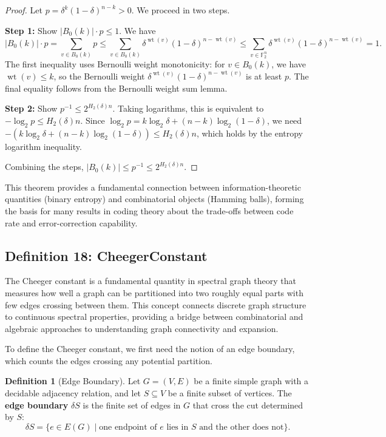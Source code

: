\documentclass[11pt]{article}
\theoremstyle{plain}
\theoremstyle{definition}
\newtheorem*{definition}{Definition}
\theoremstyle{remark}
\begin{document}
\begin{proof}
Let $p = \delta^k(1-\delta)^{n-k} > 0$. We proceed in two steps.

\textbf{Step 1:} Show $|B_0(k)| \cdot p \leq 1$. We have
\[
|B_0(k)| \cdot p = \sum_{v \in B_0(k)} p \leq \sum_{v \in B_0(k)} \delta^{\operatorname{wt}(v)}(1-\delta)^{n-\operatorname{wt}(v)} \leq \sum_{v \in \mathbb{F}_2^n} \delta^{\operatorname{wt}(v)}(1-\delta)^{n-\operatorname{wt}(v)} = 1.
\]
The first inequality uses Bernoulli weight monotonicity: for $v \in B_0(k)$, we have $\operatorname{wt}(v) \leq k$, so the Bernoulli weight $\delta^{\operatorname{wt}(v)}(1-\delta)^{n-\operatorname{wt}(v)}$ is at least $p$. The final equality follows from the Bernoulli weight sum lemma.

\textbf{Step 2:} Show $p^{-1} \leq 2^{H_2(\delta) n}$. Taking logarithms, this is equivalent to $-\log_2 p \leq H_2(\delta) n$. Since $\log_2 p = k\log_2\delta + (n-k)\log_2(1-\delta)$, we need $-(k\log_2\delta + (n-k)\log_2(1-\delta)) \leq H_2(\delta) n$, which holds by the entropy logarithm inequality.

Combining the steps, $|B_0(k)| \leq p^{-1} \leq 2^{H_2(\delta) n}$.
\end{proof}

This theorem provides a fundamental connection between information-theoretic quantities (binary entropy) and combinatorial objects (Hamming balls), forming the basis for many results in coding theory about the trade-offs between code rate and error-correction capability.

\vspace{1em}

\subsection{Definition 18: CheegerConstant}

The Cheeger constant is a fundamental quantity in spectral graph theory that measures how well a graph can be partitioned into two roughly equal parts with few edges crossing between them. This concept connects discrete graph structure to continuous spectral properties, providing a bridge between combinatorial and algebraic approaches to understanding graph connectivity and expansion.

To define the Cheeger constant, we first need the notion of an edge boundary, which counts the edges crossing any potential partition.

\begin{definition}[Edge Boundary]
Let $G = (V, E)$ be a finite simple graph with a decidable adjacency relation, and let $S \subseteq V$ be a finite subset of vertices. The \textbf{edge boundary} $\delta S$ is the finite set of edges in $G$ that cross the cut determined by $S$:
\[
\delta S = \{e \in E(G) \mid \text{one endpoint of } e \text{ lies in } S \text{ and the other does not}\}.
\]
\end{definition}
\end{document}
